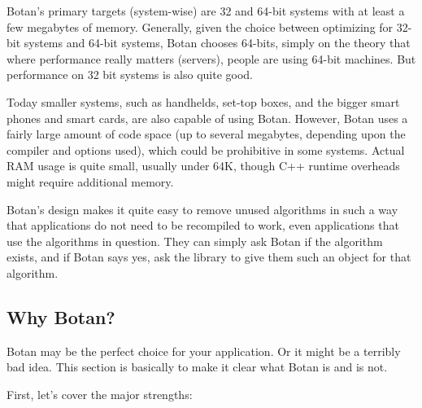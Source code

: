 \documentclass{article}
\begin{document}
Botan's primary targets (system-wise) are 32 and 64-bit systems with at least a
few megabytes of memory. Generally, given the choice between optimizing for
32-bit systems and 64-bit systems, Botan chooses 64-bits, simply on the theory
that where performance really matters (servers), people are using 64-bit
machines. But performance on 32 bit systems is also quite good.

Today smaller systems, such as handhelds, set-top boxes, and the
bigger smart phones and smart cards, are also capable of using
Botan. However, Botan uses a fairly large amount of code space (up to
several megabytes, depending upon the compiler and options used),
which could be prohibitive in some systems. Actual RAM usage is quite
small, usually under 64K, though C++ runtime overheads might require
additional memory.

Botan's design makes it quite easy to remove unused algorithms in such a way
that applications do not need to be recompiled to work, even applications that
use the algorithms in question. They can simply ask Botan if the algorithm
exists, and if Botan says yes, ask the library to give them such an object for
that algorithm.

\pagebreak

\subsection{Why Botan?}

Botan may be the perfect choice for your application. Or it might be a
terribly bad idea. This section is basically to make it clear what Botan is
and is not.

First, let's cover the major strengths:
\end{document}
